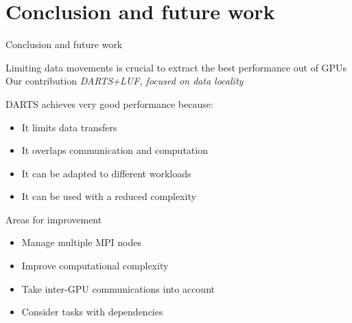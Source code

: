 \documentclass{libs/ufc_format}
\begin{document}
\section{Conclusion and future work}
\begin{frame}{Conclusion and future work}
\begin{block}{Limiting data movements is crucial to extract the best performance out of GPUs}
	Our contribution \MVRightarrow{}
	\emph{DARTS+LUF, focused on data locality}
\end{block}
\begin{exampleblock}{DARTS achieves very good performance because:}
		\begin{itemize}
			\item It limits data transfers
			\item It overlaps communication and computation
			\item It can be adapted to different workloads
			\item It can be used with a reduced complexity
		\end{itemize}
\end{exampleblock}
		
	\begin{exampleblock}{Areas for improvement}
		\begin{itemize}
		\item Manage multiple MPI nodes
		\item Improve computational complexity
		\item Take inter-GPU communications into account
		\item Consider tasks with dependencies
		\end{itemize}
	\end{exampleblock}
\end{frame}
\end{document}
